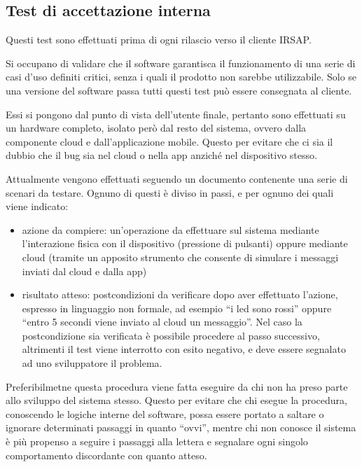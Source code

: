 \documentclass[12pt,a4paper,twoside,titlepage]{book}
\begin{document}
\subsection{Test di accettazione interna}

Questi test sono effettuati prima di ogni rilascio verso il cliente IRSAP.

Si occupano di validare che il software garantisca il funzionamento di una serie di casi d'uso
definiti critici, senza i quali il prodotto non sarebbe utilizzabile.
Solo se una versione del software passa tutti questi test può essere consegnata al cliente.

Essi si pongono dal punto di vista dell'utente finale, pertanto sono effettuati su un
hardware completo, isolato però dal resto del sistema, ovvero dalla componente cloud
e dall'applicazione mobile. Questo per evitare che ci sia il dubbio che il bug sia
nel cloud o nella app anziché nel dispositivo stesso.

Attualmente vengono effettuati seguendo un documento contenente una serie di scenari da testare.
Ognuno di questi è diviso in passi, e per ognuno dei quali viene indicato:

\begin{itemize}
    \item azione da compiere: un'operazione da effettuare sul sistema mediante l'interazione fisica
        con il dispositivo (pressione di pulsanti) oppure mediante cloud (tramite un apposito
        strumento che consente di simulare i messaggi inviati dal cloud e dalla app)
    \item risultato atteso: postcondizioni da verificare dopo aver effettuato l'azione, espresso in
        linguaggio non formale, ad esempio ``i \acrshort{led} sono rossi'' oppure ``entro 5 secondi viene inviato al cloud un messaggio''.
        Nel caso la postcondizione sia verificata è possibile procedere al passo successivo, altrimenti
        il test viene interrotto con esito negativo, e deve essere segnalato ad uno sviluppatore il problema.
\end{itemize}

Preferibilmetne questa procedura viene fatta eseguire da chi non ha preso parte allo
sviluppo del sistema stesso. Questo per evitare che chi esegue la procedura, conoscendo
le logiche interne del software, possa essere portato a saltare o ignorare determinati
passaggi in quanto ``ovvi'', mentre chi non conosce il sistema è più propenso a seguire
i passaggi alla lettera e segnalare ogni singolo comportamento discordante con quanto
atteso.
\end{document}
